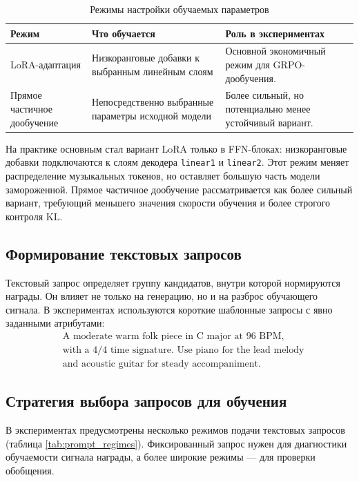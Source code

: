 \documentclass[a4paper,12pt]{extarticle}
\begin{document}
\begin{table}[ht]
\centering
\caption{Режимы настройки обучаемых параметров}
\label{tab:adaptation_modes}
\begin{tabular}{|p{}|p{}|p{}|}
\hline
\textbf{Режим} & \textbf{Что обучается} & \textbf{Роль в экспериментах} \\
\hline
LoRA-адаптация \cite{hu2021lora} & Низкоранговые добавки к выбранным линейным слоям & Основной экономичный режим для GRPO-дообучения. \\
\hline
Прямое частичное дообучение & Непосредственно выбранные параметры исходной модели & Более сильный, но потенциально менее устойчивый вариант. \\
\hline
\end{tabular}
\end{table}

На практике основным стал вариант LoRA только в FFN-блоках:
низкоранговые добавки подключаются к слоям декодера \texttt{linear1} и
\texttt{linear2}. Этот режим меняет распределение музыкальных токенов,
но оставляет большую часть модели замороженной. Прямое частичное
дообучение рассматривается как более сильный вариант, требующий меньшего
значения скорости обучения и более строгого контроля KL.

\subsection{Формирование текстовых запросов}

Текстовый запрос определяет группу кандидатов, внутри которой нормируются награды.
Он влияет не только на генерацию, но и на разброс обучающего
сигнала. В экспериментах используются короткие шаблонные запросы с
явно заданными атрибутами:
\[
\begin{aligned}
&\text{A moderate warm folk piece in C major at 96 BPM,}\\
&\text{with a 4/4 time signature. Use piano for the lead melody}\\
&\text{and acoustic guitar for steady accompaniment.}
\end{aligned}
\]

\subsection{Стратегия выбора запросов для обучения}

В экспериментах предусмотрены несколько режимов подачи текстовых запросов
(таблица \ref{tab:prompt_regimes}). Фиксированный запрос нужен для
диагностики обучаемости сигнала награды, а более широкие режимы --- для
проверки обобщения.
\end{document}
